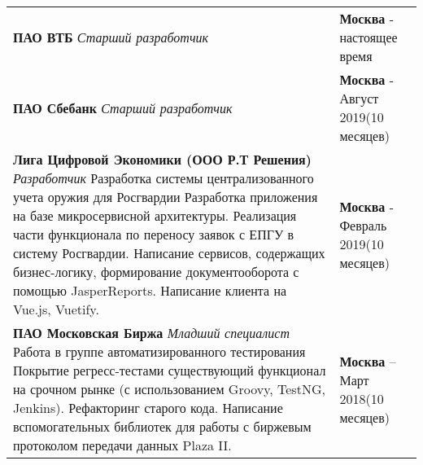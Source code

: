 \documentclass{article}
\begin{document}
\begin{table}[h!]
\begin{center}

\def\arraystretch{2}%

\begin{tabular}
{ L{14cm} R{4cm} } \hhline{|=|=|}

\textbf{ПАО ВТБ}\newline
\emph{Старший разработчик}\newline

& \textbf{Москва} - настоящее время \\ 

\textbf{ПАО Сбебанк}\newline
\emph{Старший разработчик}\newline
& \textbf{Москва} - Август 2019\newline(10 месяцев) \\  

\textbf{Лига Цифровой Экономики (ООО Р.Т Решения)}\newline
\emph{Разработчик}\newline
Разработка системы централизованного учета оружия для Росгвардии\newline
Разработка приложения на базе микросервисной архитектуры. Реализация части функционала по переносу заявок с ЕПГУ в систему Росгвардии. Написание сервисов, содержащих бизнес-логику, формирование документооборота с помощью JasperReports. Написание клиента на Vue.js, Vuetify.
& \textbf{Москва} - Февраль 2019\newline(10 месяцев) \\ 

\textbf{ПАО Московская Биржа}\newline
\emph{Младший специалист}\newline
Работа в группе автоматизированного тестирования\newline
Покрытие регресс-тестами существующий функционал на срочном рынке (с использованием Groovy, TestNG, Jenkins). Рефакторинг старого кода. Написание вспомогательных библиотек для работы с биржевым протоколом передачи данных Plaza II.
& \textbf{Москва} – Март 2018\newline(10 месяцев) \\

\end{tabular}

\end{center}
\end{table}
\end{document}
